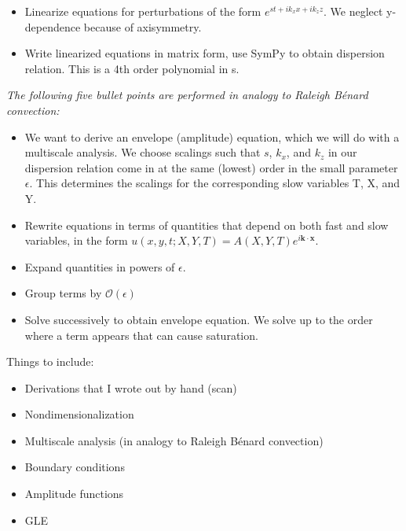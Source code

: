 \documentclass[letterpaper,12pt]{article}
\begin{document}
\begin{itemize}
\item Linearize equations for perturbations of the form $e^{st + ik_x x + ik_z z}$. We neglect y-dependence because of axisymmetry.
\item Write linearized equations in matrix form, use SymPy to obtain dispersion relation. This is a 4th order polynomial in s.
\end{itemize}
\textit{The following five bullet points are performed in analogy to Raleigh B\'enard convection:}
\begin{itemize}
\item We want to derive an envelope (amplitude) equation, which we will do with a multiscale analysis. We choose scalings such that $s$, $k_x$, and $k_z$ in our dispersion relation come in at the same (lowest) order in the small parameter $\epsilon$. This determines the scalings for the corresponding slow variables T, X, and Y.
\item Rewrite equations in terms of quantities that depend on both fast and slow variables, in the form $u(x, y, t; X, Y, T) = A(X, Y, T)e^{i\mathbf{k} \cdot \mathbf{x}}$.
\item Expand quantities in powers of $\epsilon$.
\item Group terms by $\mathcal{O}\left(\epsilon\right)$
\item Solve successively to obtain envelope equation. We solve up to the order where a term appears that can cause saturation.\\



\end{itemize} 

\noindent Things to include:
\begin{itemize}
\item Derivations that I wrote out by hand (scan)
\item Nondimensionalization 
\item Multiscale analysis (in analogy to Raleigh B\'enard convection)
\item Boundary conditions
\item Amplitude functions
\item GLE
\end{itemize}
\end{document}
